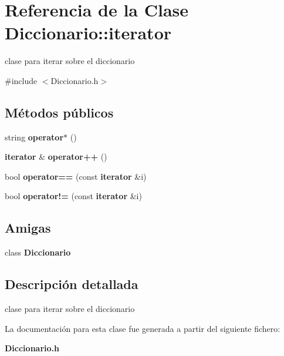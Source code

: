\section{Referencia de la Clase Diccionario\+:\+:iterator}
\label{classDiccionario_1_1iterator}


clase para iterar sobre el diccionario  




{\ttfamily \#include $<$Diccionario.\+h$>$}

\subsection*{Métodos públicos}
\begin{DoxyCompactItemize}
\item 
\mbox{\label{classDiccionario_1_1iterator_aa03a8aa59bb2b36d4b6d6540afc18deb}} 
string {\bfseries operator$\ast$} ()
\item 
\mbox{\label{classDiccionario_1_1iterator_ae3f020050c891ff3a94e599879401729}} 
\textbf{ iterator} \& {\bfseries operator++} ()
\item 
\mbox{\label{classDiccionario_1_1iterator_a6ab38d0620a196200714ee04291dea55}} 
bool {\bfseries operator==} (const \textbf{ iterator} \&i)
\item 
\mbox{\label{classDiccionario_1_1iterator_a5d51cafd201ab15390e991c6aed327ee}} 
bool {\bfseries operator!=} (const \textbf{ iterator} \&i)
\end{DoxyCompactItemize}
\subsection*{Amigas}
\begin{DoxyCompactItemize}
\item 
\mbox{\label{classDiccionario_1_1iterator_ad36be158dde0129b4e0d03d0e454a26b}} 
class {\bfseries Diccionario}
\end{DoxyCompactItemize}


\subsection{Descripción detallada}
clase para iterar sobre el diccionario 

La documentación para esta clase fue generada a partir del siguiente fichero\+:\begin{DoxyCompactItemize}
\item 
\textbf{ Diccionario.\+h}\end{DoxyCompactItemize}
